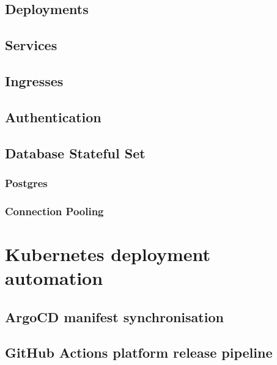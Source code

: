 \subsection{Deployments}
\subsection{Services}
\subsection{Ingresses}
\subsection{Authentication}
\subsection{Database Stateful Set}
\subsubsection{Postgres}
\subsubsection{Connection Pooling}

\section{Kubernetes deployment automation}
\subsection{ArgoCD manifest synchronisation}
\subsection{GitHub Actions platform release pipeline}